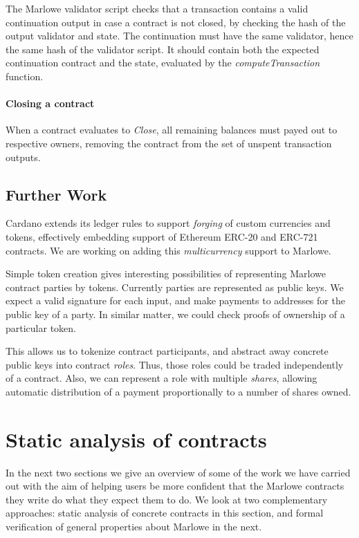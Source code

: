 \documentclass[runningheads]{llncs}
\begin{document}
The Marlowe validator script checks that a transaction contains a valid continuation
output in case a contract is not closed, by checking the hash of the output validator and state.
The continuation must have the same validator, hence the same hash of the validator script.
It should contain both the expected continuation contract and the state, evaluated by the \emph{computeTransaction}
function.

\paragraph{Closing a contract}

When a contract evaluates to \emph{Close}, all remaining balances must payed out
to respective owners, removing the contract from the set of unspent transaction outputs.

\subsection{Further Work}

Cardano extends its ledger rules to support \emph{forging} of custom currencies and tokens,
effectively embedding support of Ethereum ERC-20 and ERC-721 contracts.
We are working on adding this \emph{multicurrency} support to Marlowe.

Simple token creation gives interesting possibilities of representing Marlowe contract parties by tokens.
Currently parties are represented as public keys. We expect a valid signature for each input,
and make payments to  addresses for the public key of a party.
In similar matter, we could check proofs of ownership of a particular token.

This allows us to tokenize contract participants, and abstract away concrete public keys into contract \emph{roles}.
Thus, those roles could be traded independently of a contract.
Also, we can represent a role with multiple \emph{shares}, allowing automatic distribution of a payment
proportionally to a number of shares owned.


\section{Static analysis of contracts\label{sec:static}}

In the next two sections we give an overview of some of the work we have carried out with the aim of helping users be more confident that the Marlowe contracts they write do what they expect them to do.
We look at two complementary approaches: static analysis of concrete contracts in this section,  and formal verification of general properties about Marlowe in the next.
\end{document}
